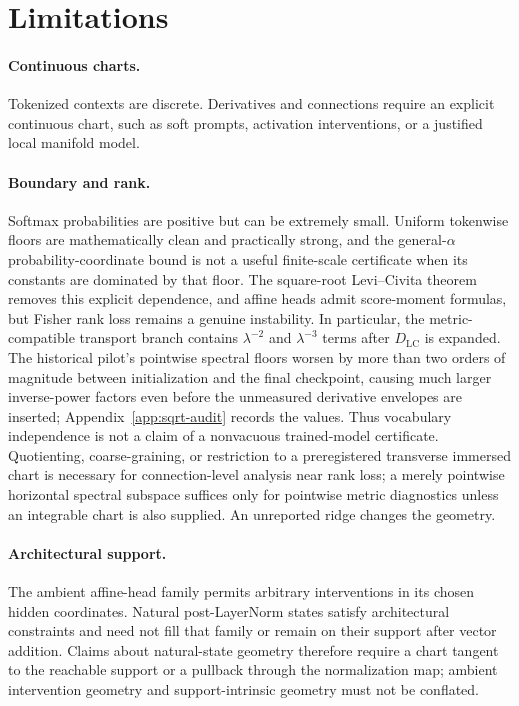 \documentclass[11pt]{article}
\theoremstyle{definition}
\theoremstyle{remark}
\newcommand{\LC}{\mathrm{LC}}
\begin{document}
\section{Limitations}

\paragraph{Continuous charts.}
Tokenized contexts are discrete. Derivatives and connections require an explicit continuous chart, such as soft prompts, activation interventions, or a justified local manifold model.

\paragraph{Boundary and rank.}
Softmax probabilities are positive but can be extremely small. Uniform tokenwise floors are mathematically clean and practically strong, and the general-$\alpha$ probability-coordinate bound is not a useful finite-scale certificate when its constants are dominated by that floor. The square-root Levi--Civita theorem removes this explicit dependence, and affine heads admit score-moment formulas, but Fisher rank loss remains a genuine instability. In particular, the metric-compatible transport branch contains $\lambda^{-2}$ and $\lambda^{-3}$ terms after $D_{\LC}$ is expanded. The historical pilot's pointwise spectral floors worsen by more than two orders of magnitude between initialization and the final checkpoint, causing much larger inverse-power factors even before the unmeasured derivative envelopes are inserted; Appendix~\ref{app:sqrt-audit} records the values. Thus vocabulary independence is not a claim of a nonvacuous trained-model certificate. Quotienting, coarse-graining, or restriction to a preregistered transverse immersed chart is necessary for connection-level analysis near rank loss; a merely pointwise horizontal spectral subspace suffices only for pointwise metric diagnostics unless an integrable chart is also supplied. An unreported ridge changes the geometry.

\paragraph{Architectural support.}
The ambient affine-head family permits arbitrary interventions in its chosen hidden coordinates. Natural post-LayerNorm states satisfy architectural constraints and need not fill that family or remain on their support after vector addition. Claims about natural-state geometry therefore require a chart tangent to the reachable support or a pullback through the normalization map; ambient intervention geometry and support-intrinsic geometry must not be conflated.
\end{document}
